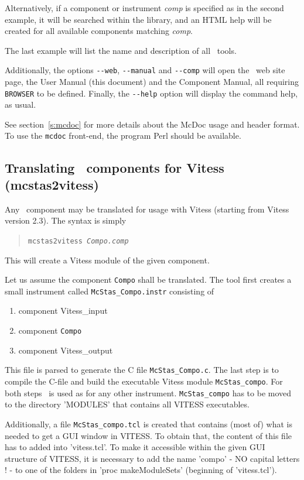 Alternatively, if a component or instrument {\it comp} is specified as in the second example, it will be searched within the library, and an HTML help will be created for all available components matching {\it comp}.

The last example will list the name and description of all \MCS\ tools.

Additionally, the options \verb+--web+, \verb+--manual+ and \verb+--comp+ will open the \MCS\ web site page, the User Manual (this document) and the Component Manual, all requiring \verb+BROWSER+ to be defined. Finally, the \verb+--help+ option will display the command help, as usual.

See section~\ref{s:mcdoc} for more details about the McDoc usage and header format.
To use the \verb+mcdoc+ front-end, the program Perl should be available.

\subsection{Translating \MCS\ components for Vitess (mcstas2vitess)}
\label{s:mcstas2vitess}

Any \MCS\ component may be translated for usage with Vitess (starting from Vitess version 2.3). The syntax is simply 
\begin{quote}
  \texttt{mcstas2vitess {\it Compo.comp\/}}
\end{quote}
This will create a Vitess module of the given component.

Let us assume the component \verb+Compo+ shall be translated. The tool first creates a small instrument called \verb+McStas_Compo.instr+ consisting of
\begin{enumerate}
\item component Vitess\_input
\item component \verb+Compo+
\item component Vitess\_output
\end{enumerate}

This file is parsed to generate the C file \verb+McStas_Compo.c+. The last step is to compile the C-file and build the executable Vitess module \verb'McStas_compo'. For both steps \MCS\ is used as for any other instrument. \verb'McStas_compo' has to be moved to the directory 'MODULES' that contains all VITESS executables.

Additionally, a file \verb'McStas_compo.tcl' is created that contains (most of) what is needed to get a GUI window in VITESS. To obtain that, the content of this file has to added into 'vitess.tcl'. To make it accessible within the given GUI structure of VITESS, it is necessary to add the name 'compo' - NO capital letters ! - to one of the folders in 'proc makeModuleSets{}' (beginning of 'vitess.tcl').


